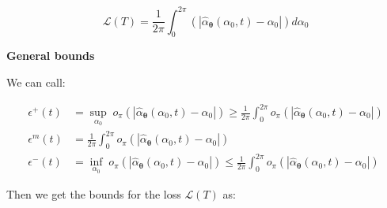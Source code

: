 \documentclass{article} %
\newcounter{ct}
\theoremstyle{definition}
\theoremstyle{remark}
\begin{document}
\begin{equation}
    \mathcal{L}(T) =  \frac{1}{2 \pi} \int_0^{2 \pi}    \left( \left| \hat{\alpha}_{\boldsymbol{\theta}}(\alpha_0, t) - \alpha_0  \right| \right)  d\alpha_0
\end{equation}


%







\textbf{General bounds}

We can call:

\begin{equation}
\begin{split}
    \epsilon^+(t) &= \sup_{\alpha_0} \; o_\pi \left( \left| \hat{\alpha}_{\boldsymbol{\theta}}(\alpha_0, t) - \alpha_0  \right| \right) \geq \frac{1}{2 \pi} \int_0^{2 \pi}  o_\pi \left( \left| \hat{\alpha}_{\boldsymbol{\theta}}(\alpha_0, t) - \alpha_0  \right| \right)  \\
     \epsilon^{m}(t) &= \frac{1}{2 \pi} \int_0^{2 \pi}  o_\pi \left( \left| \hat{\alpha}_{\boldsymbol{\theta}}(\alpha_0, t) - \alpha_0  \right| \right) \\
    \epsilon^-(t) &= \inf_{\alpha_0} \; o_\pi \left( \left| \hat{\alpha}_{\boldsymbol{\theta}}(\alpha_0, t) - \alpha_0  \right| \right) \leq \frac{1}{2 \pi} \int_0^{2 \pi}  o_\pi \left( \left| \hat{\alpha}_{\boldsymbol{\theta}}(\alpha_0, t) - \alpha_0  \right| \right)
\end{split}
\end{equation}

Then we get the bounds for the loss \(\mathcal{L}(T)\) as:
\end{document}
